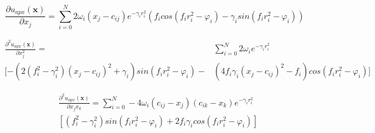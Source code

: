 \documentclass[./\jobname.tex]{subfiles}
\begin{document}
\begin{equation}
\label{eq:uapx_gsin_kernel_x0}
\frac{\partial u_{apx}(\mathbf{x})}{\partial x_j} = \sum_{i=0}^{N} 2 \omega_i (x_j - c_{ij}) e^{-\gamma_i r_i^2} (f_i cos(f_i r_i^2 - \varphi_i)-\gamma_i sin(f_i r_i^2 - \varphi_i))
\end{equation}

\begin{equation}
\label{eq:uapx_gsin_kernel_x0_x0}
\begin{split}
\frac{\partial^2 u_{apx}(\mathbf{x})}{\partial x_j^2} = & \sum_{i=0}^{N} 2 \omega_i e^{-\gamma_i r_i^2} \\ [  -(2(f_i^2 - \gamma_i^2) (x_j-c_{ij})^2 + \gamma_i) sin(f_i r_i^2 - \varphi_i) - & (4 f_i \gamma_i (x_j-c_{ij})^2 -f_i) cos(f_i r_i^2 - \varphi_i) ] 
\end{split}
\end{equation}

\begin{equation}
\label{eq:uapx_gsin_kernel_x0_x1}
\begin{split}
& \frac{\partial^2 u_{apx}(\mathbf{x})}{\partial x_j x_k} = \sum_{i=0}^{N} -4 \omega_i (c_{ij} - x_j) (c_{ik} - x_k) e^{-\gamma_i r_i^2} \\ & \left[(f_i^2 - \gamma_i^2) sin(f_i r_i^2 - \varphi_i) + 2 f_i \gamma_i cos(f_i r_i^2 - \varphi_i)\right]
\end{split}
\end{equation}
\end{document}
